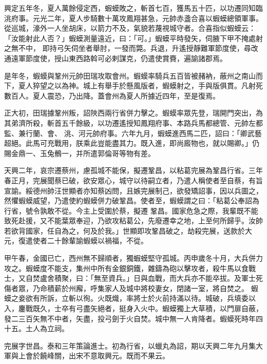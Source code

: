 \begin{pinyinscope}
 興定五年冬，夏人萬餘侵定西，蝦蟆敗之，斬首七百，獲馬五十匹，以功遷同知臨洮府事。元光二年，夏人步騎數十萬攻鳳翔甚急，元帥赤盞合喜以蝦蟆總領軍事。從巡城，濠外一人坐胡床，以箭力不及，氣貌若蔑視城守者。合喜指似蝦蟆云：「汝能射此人否？」蝦蟆測量遠近，曰：「可。」蝦蟆平時發矢，伺腋下甲不掩處射之無不中，
 即持弓矢伺坐者舉肘，一發而斃。兵退，升遙授靜難軍節度使，尋改通遠軍節度使，授山東西路斡可必剌謀克，仍遣使賞賚，遍諭諸郡焉。



 是年冬，蝦蟆與鞏州元帥田瑞攻取會州。蝦蟆率騎兵五百皆被赭衲，蔽州之南山而下，夏人猝望之以為神。城上有舉手於懸風版者，蝦蟆射之，手與版俱貫。凡射死數百人。夏人震恐，乃出降。蓋會州為夏人所據近四年，至是復焉。



 正大初，田瑞據鞏州叛，詔陜西兩行省併力擊之。蝦蟆率眾先登，瑞開門突出，為其弟濟所殺，斬首五千餘級，以功遷遙授知鳳翔府事、本路兵馬都總管、元帥左都監、兼行蘭、會、
 洮、河元帥府事。六年九月，蝦蟆進西馬二匹，詔曰：「卿武藝超絕。此馬可充戰用，朕乘此豈能盡其力。既入進，即尚廄物也，就以賜卿。」仍賜金鼎一、玉兔鶻一，并所遣郭倫哥等物有差。



 天興二年，哀宗遷蔡州，慮孤城不能保，擬遷鞏昌，以粘葛完展為鞏昌行省。三年春正月，完展聞蔡已破，欲安眾心，城守以待嗣立者，乃遣人稱使者至自蔡，有旨宣諭。綏德州帥汪世顯者亦知蔡凶問，且嫉完展制己，欲發矯詔事，因以兵圖之，然懼蝦蟆威望，乃遣使約蝦蟆併力破鞏昌。使者至，蝦蟆謂之曰：「粘葛公奉詔為行省，號令孰敢不從。今主上受圍於蔡，擬遷
 鞏昌。國家危急之際，我輩既不能致死赴援，又不能葉眾奉迎，乃欲攻粘葛公，先廢遷幸之地，上至何所歸乎。汝帥若欲背國家，任自為之，何及於我。」世顯即攻鞏昌破之，劫殺完展，送款於大元，復遣使者二十餘輩諭蝦蟆以禍福，不從。



 甲午春，金國已亡，西州無不歸順者，獨蝦蟆堅守孤城。丙申歲冬十月，大兵併力攻之。蝦蟆度不能支，集州中所有金銀銅鐵，雜鑄為砲以擊攻者，殺牛馬以食戰士，又自焚盧舍積聚，曰：「無至資兵。」日與血戰，而大兵亦不能卒拔。及軍士死傷者眾，乃命積薪於州廨，呼集家人及城中將校妻女，閉諸一室，將自焚之。
 蝦蟆之妾欲有所訴，立斬以徇。火既熾，率將士於火前持滿以待。城破，兵填委以入，鏖戰既久，士卒有弓盡矢絕者，挺身入火中。蝦蟆獨上大草積，以門扉自蔽，發二三百矢無不中者，矢盡，投弓劍于火自焚。城中無一人肯降者。蝦蟆死時年四十五。土人為立祠。



 完展字世昌。泰和三年策論進士。初為行省，以蠟丸為詔，期以天興二年九月集大軍與上會於饒峰關，出宋不意取興元。既而不果云。



\end{pinyinscope}